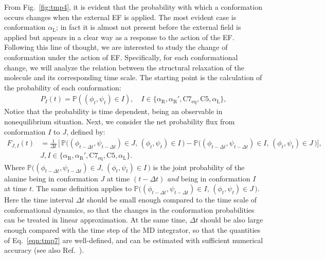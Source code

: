 \documentclass[a4paper,preprint,unsortedaddress,onecolumn]{revtex4-1}
\newcommand{\confaa}[0]{{\alpha_{\textrm{R}}}}
\newcommand{\confab}[0]{{\alpha_{\textrm{R}}'}}
\newcommand{\confba}[0]{{\textrm{C}7_{\textrm{eq}}}}
\newcommand{\confbb}[0]{{\textrm{C}5}}
\newcommand{\confc}[0]{{\alpha_{\textrm{L}}}}
\begin{document}
From Fig.~\ref{fig:tmp4}, it is evident that the probability with which a
conformation occurs changes when the external EF is applied.
The most evident case is conformation $\confc$; in fact it is {almost} not present before the external field is applied but appears in a clear way as a response to the action of the EF. Following this line of thought, we are interested to study the change of conformation under the action of EF. Specifically, for each conformational change, we will analyze the relation between the structural relaxation of the molecule and its corresponding time scale. 
The starting point is the calculation of the probability
of each conformation:
\begin{align}
  P_I(t) = \mathbb P ( (\phi_t,\psi_t) \in I), \quad  I \in \{\confaa, \confab, \confba, \confbb, \confc\},
\end{align}
Notice that the probability is time dependent, being an observable in nonequilibrium situation.
Next,
we consider the net probability flux from conformation $I$ to $J$, defined by:
\begin{align}\nonumber
  F_{J,I}(t) & = \frac1{\Delta t}\,
  \bigg[\,
  \mathbb P \big( (\phi_{t-\Delta t},\psi_{t-\Delta t}) \in J,\, (\phi_t, \psi_t) \in I \,\big) 
  -
  \mathbb P \big( (\phi_{t-\Delta t}, \psi_{t-\Delta t}) \in I,\, (\phi_t, \psi_t) \in J \,\big)
  \bigg], \\\label{eqn:tmp7}
  & J,I \in \{\confaa, \confab, \confba, \confbb, \confc\}.
\end{align}
Where $\mathbb P\big( (\phi_{t-\Delta t}, \psi_{t-\Delta t}) \in J,\, (\phi_t, \psi_t) \in I\,\big)$
is the joint probability of the alanine being in conformation $J$ at
time $(t-\Delta t)$ \emph{and} being in conformation $I$ at time $t$.
The same definition applies to
$\mathbb P \big( (\phi_{t-\Delta t}, \psi_{t-\Delta t}) \in I,\, (\phi_t, \psi_t) \in J\,\big)$.
Here the time interval $\Delta t$ should be small enough compared to the
time scale of conformational dynamics,
so that the changes in the conformation probabilities
can be treated in linear approximation.
At the same time,  $\Delta t$ should be also large enough compared with
the time step of the MD integrator, 
so that the quantities of Eq.~\eqref{eqn:tmp7} are well-defined, and can be
estimated with sufficient numerical accuracy (see also Ref.~\cite{schuette2011markov}).
\end{document}
